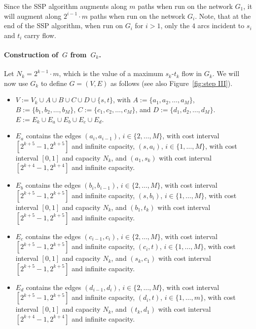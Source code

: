 \documentclass[11pt]{article}
\begin{document}
Since the SSP algorithm augments along $m$ paths when run on the network $G_1$, it will augment along $2^{i-1}\cdot m$ paths when run on the network $G_i$.
Note, that at the end of the SSP algorithm, when run on $G_i$ for $i > 1$, only the $4$ arcs incident to $s_i$ and $t_i$ carry flow. 


\paragraph{Construction of~$G$ from~$G_k$.}
Let $N_k = 2^{k-1}\cdot m$, which is the value of a maximum $s_k$-$t_k$ flow in $G_k$. We will now use $G_k$ to define $G=(V,E)$ as follows
(see also Figure~\ref{fig:step III}).
\begin{itemize}
\setlength{\itemsep}{0cm}
\item $V := V_k \cup A \cup B \cup C \cup D \cup \{s,t\}$, with $A := \{a_1,a_2,\dots,a_M\}$, $B := \{b_1,b_2,\dots,b_M\}$, $C := \{c_1,c_2,\dots,c_M\}$, and $D := \{d_1,d_2,\dots,d_M\}$. $E:= E_k \cup E_a \cup E_b \cup E_c \cup E_d$.\newline
\item $E_a$ contains the edges $(a_i,a_{i-1})$, $i \in \{2,\dots,M\}$, with cost interval $[2^{k+5}-1,2^{k+5}]$ and infinite capacity,
$(s,a_i)$, $i \in \{1,\dots,M\}$, with cost interval $[0,1]$ and capacity $N_k$, and $(a_1,s_k)$ with cost interval $[2^{k+4}-1,2^{k+4}]$ and infinite capacity.\newline
\item $E_b$ contains the edges $(b_i,b_{i-1})$, $i \in \{2,\dots,M\}$, with cost interval $[2^{k+5}-1,2^{k+5}]$ and infinite capacity,
$(s,b_i)$, $i \in \{1,\dots,M\}$, with cost interval $[0,1]$ and capacity $N_k$, and $(b_1,t_k)$ with cost interval $[2^{k+5}-1,2^{k+5}]$ and infinite capacity.\newline
\item $E_c$ contains the edges $(c_{i-1},c_i)$, $i \in \{2,\dots,M\}$, with cost interval $[2^{k+5}-1,2^{k+5}]$ and infinite capacity,
$(c_i,t)$, $i \in \{1,\dots,M\}$, with cost interval $[0,1]$ and capacity $N_k$, and $(s_k,c_1)$ with cost interval $[2^{k+5}-1,2^{k+5}]$ and infinite capacity.\newline
\item $E_d$ contains the edges $(d_{i-1},d_i)$, $i \in \{2,\dots,M\}$, with cost interval $[2^{k+5}-1,2^{k+5}]$ and infinite capacity,
$(d_i,t)$, $i \in \{1,\dots,m\}$, with cost interval $[0,1]$ and capacity $N_k$, and $(t_k,d_1)$ with cost interval $[2^{k+4}-1,2^{k+4}]$ and infinite capacity.
\end{itemize}
\end{document}

